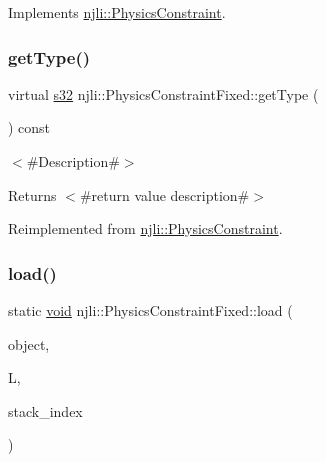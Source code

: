 Implements \mbox{\hyperlink{classnjli_1_1_physics_constraint_af4cb8c0158a044f75fe61f89cc278338}{njli\+::\+Physics\+Constraint}}.

\mbox{\label{classnjli_1_1_physics_constraint_fixed_a15e1155bd37763d3e7d012bcb12a4d26}} 
\subsubsection{\texorpdfstring{get\+Type()}{getType()}}
{\footnotesize\ttfamily virtual \mbox{\hyperlink{_util_8h_aa62c75d314a0d1f37f79c4b73b2292e2}{s32}} njli\+::\+Physics\+Constraint\+Fixed\+::get\+Type (\begin{DoxyParamCaption}{ }\end{DoxyParamCaption}) const\hspace{0.3cm}{\ttfamily [virtual]}}

$<$\#\+Description\#$>$

\begin{DoxyReturn}{Returns}
$<$\#return value description\#$>$ 
\end{DoxyReturn}


Reimplemented from \mbox{\hyperlink{classnjli_1_1_physics_constraint_a3234aefaf2706165fbc52b5b37c05888}{njli\+::\+Physics\+Constraint}}.

\mbox{\label{classnjli_1_1_physics_constraint_fixed_a80035a24ccca3f5b3888646059ba8c13}} 
\subsubsection{\texorpdfstring{load()}{load()}}
{\footnotesize\ttfamily static \mbox{\hyperlink{_thread_8h_af1e856da2e658414cb2456cb6f7ebc66}{void}} njli\+::\+Physics\+Constraint\+Fixed\+::load (\begin{DoxyParamCaption}\item[{\mbox{\hyperlink{classnjli_1_1_physics_constraint_fixed}{Physics\+Constraint\+Fixed}} \&}]{object,  }\item[{lua\+\_\+\+State $\ast$}]{L,  }\item[{int}]{stack\+\_\+index }\end{DoxyParamCaption})\hspace{0.3cm}{\ttfamily [static]}}

